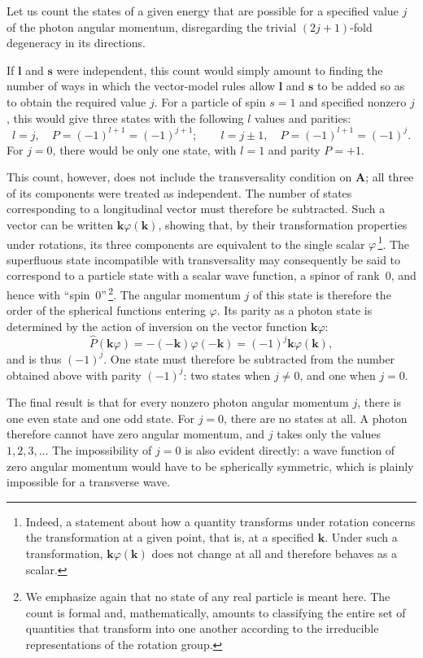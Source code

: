 Let us count the states of a given energy that are possible for a specified value $j$ of the photon angular momentum, disregarding the trivial $(2j + 1)$-fold degeneracy in its directions.

If $\mathbf{l}$ and $\mathbf{s}$ were independent, this count would simply amount to finding the number of ways in which the vector-model rules allow $\mathbf{l}$ and $\mathbf{s}$ to be added so as to obtain the required value $j$. For a particle of spin $s = 1$ and specified nonzero $j$, this would give three states with the following $l$ values and parities:
\[
l = j,\quad P = (-1)^{l+1} = (-1)^{j+1};
\qquad
l = j \pm 1,\quad P = (-1)^{l+1} = (-1)^j.
\]
For $j = 0$, there would be only one state, with $l = 1$ and parity $P = +1$.

This count, however, does not include the transversality condition on $\mathbf{A}$; all three of its components were treated as independent. The number of states corresponding to a longitudinal vector must therefore be subtracted. Such a vector can be written $\mathbf{k}\varphi(\mathbf{k})$, showing that, by their transformation properties under rotations, its three components are equivalent to the single scalar $\varphi$\,\footnote{Indeed, a statement about how a quantity transforms under rotation concerns the transformation at a given point, that is, at a specified $\mathbf{k}$. Under such a transformation, $\mathbf{k}\varphi(\mathbf{k})$ does not change at all and therefore behaves as a scalar.}. The superfluous state incompatible with transversality may consequently be said to correspond to a particle state with a scalar wave function, a spinor of rank~0, and hence with ``spin~0''\,\footnote{We emphasize again that no state of any real particle is meant here. The count is formal and, mathematically, amounts to classifying the entire set of quantities that transform into one another according to the irreducible representations of the rotation group.}. The angular momentum $j$ of this state is therefore the order of the spherical functions entering $\varphi$. Its parity as a photon state is determined by the action of inversion on the vector function $\mathbf{k}\varphi$:
\[
\widehat P(\mathbf{k}\varphi) = -(-\mathbf{k})\varphi(-\mathbf{k}) = (-1)^j\mathbf{k}\varphi(\mathbf{k}),
\]
and is thus $(-1)^j$. One state must therefore be subtracted from the number obtained above with parity $(-1)^j$: two states when $j \ne 0$, and one when $j = 0$.

The final result is that for every nonzero photon angular momentum $j$, there is one even state and one odd state. For $j = 0$, there are no states at all. A photon therefore cannot have zero angular momentum, and $j$ takes only the values $1, 2, 3, \ldots$ The impossibility of $j = 0$ is also evident directly: a wave function of zero angular momentum would have to be spherically symmetric, which is plainly impossible for a transverse wave.

